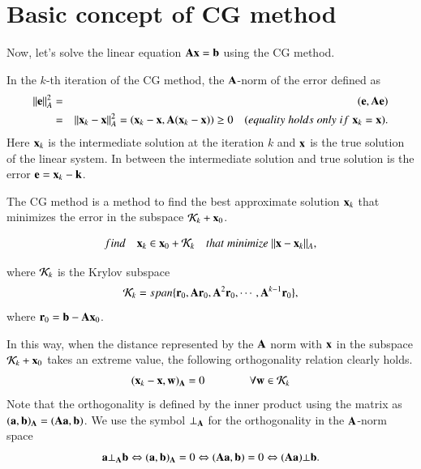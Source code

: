 \section{Basic concept of CG method}


Now, let's solve the linear equation $\mathbf{A}\mathbf{x}=\mathbf{b}$ using the CG method.


In the $k$-th iteration of the CG method, the $\mathbf{A}$-norm of the error defined as
%
\begin{eqnarray}
||\mathbf{e}||_A^2
&=&
(\mathbf{e},\mathbf{A}\mathbf{e})\\
&=&
||\mathbf{x}_k-\mathbf{x}||_A^2
=
\left(\mathbf{x}_k-\mathbf{x},\mathbf{A}(\mathbf{x}_k-\mathbf{x})\right)\ge0
\quad
(equality\;holds\;only\;if\;\mathbf{x}_k=\mathbf{x}).
\end{eqnarray}
%
Here $\mathbf{x}_k$ is the intermediate solution at the iteration $k$ and $\mathbf{x}$ is the true solution of the linear system. In between the intermediate solution and true solution is the error  $\mathbf{e}=\mathbf{x}_k-\mathbf{k}$.


The CG method is a method to find the best approximate solution $\mathbf{x}_k$ that minimizes the error in the subspace ${\cal K}_k+\mathbf{x}_0$. 
%
\begin {screen}
\begin{equation}
find \quad \mathbf{x}_k\in\mathbf{x}_0+\mathbf{\cal K}_k\quad that\;minimize\;||\mathbf{x}-\mathbf{x}_k||_A,
\label{eqn:cg1}
\end{equation}
\end {screen}
%
where ${\cal K}_k$ is the Krylov subspace 
%
\begin{equation}
\mathbf{\cal K}_k=span\{\mathbf{r}_0,\mathbf{A}\mathbf{r}_0,\mathbf{A}^2\mathbf{r}_0,\cdots,\mathbf{A}^{k-1}\mathbf{r}_0\},
\label{eqn:krylov}
\end{equation}
where $\mathbf{r}_0=\mathbf{b}-\mathbf{A}\mathbf{x}_0$.



In this way, when the distance represented by the $\mathbf{A}$ norm with $\mathbf{x}$ in the subspace ${\cal K}_k+\mathbf{x}_0$ takes an extreme value, the following orthogonality relation clearly holds.
%
\begin{equation}
(\mathbf{x}_k-\mathbf{x},\mathbf{w})_{\mathbf{A}} = 0 \qquad \qquad \forall\mathbf{w}\in{\cal K}_k
\end{equation}
%
Note that the orthogonality is defined by the inner product using the matrix as $(\mathbf{a},\mathbf{b})_{\mathbf{A}}=(\mathbf{A}\mathbf{a},\mathbf{b})$.
%
We use the symbol $\bot_{\mathbf{A}}$ for the orthogonality in the $\mathbf{A}$-norm space
\begin{equation}
\mathbf{a}\bot_{\mathbf{A}}\mathbf{b} \Leftrightarrow (\mathbf{a},\mathbf{b})_{\mathbf{A}}=0 \Leftrightarrow (\mathbf{A}\mathbf{a},\mathbf{b})=0\Leftrightarrow (\mathbf{A}\mathbf{a}) \bot \mathbf{b}.
\end{equation}


